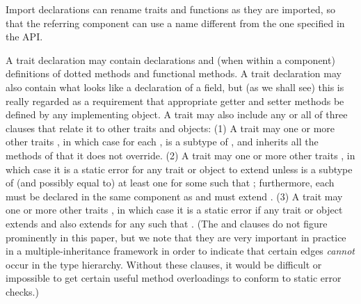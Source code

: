 Import declarations can rename traits and functions as they are imported, so that the referring component
can use a name different from the one specified in the API.

A trait declaration may contain declarations and (when within a component) definitions
of dotted methods and functional methods.  A trait declaration may also contain what looks
like a declaration of a field, but (as we shall see) this is really regarded as a requirement
that appropriate getter and setter methods be defined by any implementing object.
A trait may also include any or all of three clauses that relate it to other traits and objects:
(1) A trait  may  one or more other traits , in which case
for each ,  is a subtype of , and  inherits all the methods of  that it does not override.
(2) A trait  may  one or more other traits , in which case
it is a static error for any trait or object  to extend  unless  is a subtype of (and possibly equal to) at least one 
for some  such that ; furthermore, each  must be declared in the same component as 
and must extend .
(3) A trait  may  one or more other traits , in which case
it is a static error if any trait or object  extends  and also extends 
for any  such that .  (The  and  clauses do not figure
prominently in this paper, but we note that they are very important in practice in a
multiple-inheritance framework in order to indicate that certain edges \emph{cannot} occur
in the type hierarchy.  Without these clauses, it would be difficult or impossible to
get certain useful method overloadings to conform to static error checks.)



